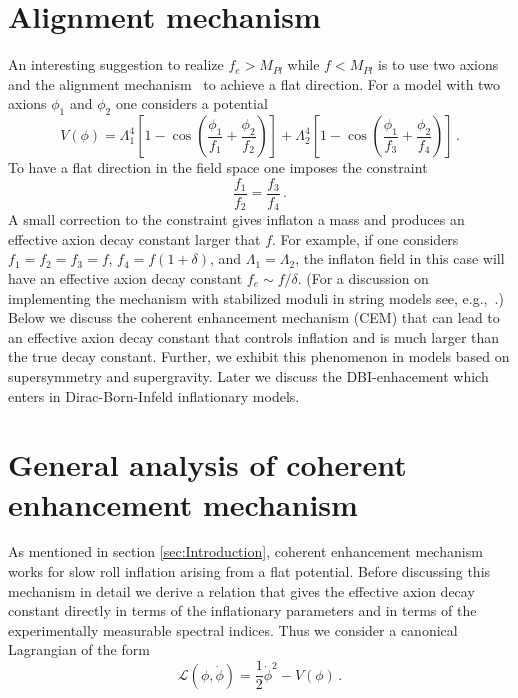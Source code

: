 \documentclass[12pt]{article}
\begin{document}
\section{Alignment mechanism \label{sec:Alignment}}
An interesting suggestion to realize $f_e > M_{Pl}$ while $f < M_{Pl}$ is to use two axions and the alignment mechanism~\cite{Kim:2004rp} to achieve a flat direction.
For a model with two axions $\phi_1$ and $\phi_2$ one considers a potential
\begin{equation} \label{eq:alignmentPotential}
  V(\phi)
    = \Lambda^4_1 \left[1 - \cos\left(\frac{\phi_1}{f_1} + \frac{\phi_2}{f_2}\right)\right]
    + \Lambda^4_2 \left[1 - \cos\left(\frac{\phi_1}{f_3} + \frac{\phi_2}{f_4}\right)\right]\,.
\end{equation}
To have a flat direction in the field space one imposes the constraint
\begin{equation} \label{eq:alignmentConstraint}
  \frac{f_1}{f_2} = \frac{f_3}{f_4}\,.
\end{equation}
A small correction to the constraint gives inflaton a mass and produces an effective axion decay constant larger that $f$.
For example, if one considers $f_1 = f_2 = f_3 = f$, $f_4 = f\left(1 + \delta\right)$, and $\Lambda_1 = \Lambda_2$, the inflaton field in this case will have an effective axion decay constant $f_e \sim f / \delta$.
(For a discussion on implementing the mechanism with stabilized moduli in string models see, e.g.,~\cite{Long:2014dta}.)
Below we discuss the coherent enhancement mechanism (CEM) that can lead to an effective axion decay constant that controls inflation and is much larger than the true decay constant.
Further, we exhibit this phenomenon in models based on supersymmetry and supergravity.
Later we discuss the DBI-enhacement which enters in Dirac-Born-Infeld inflationary models.

\section{General analysis of coherent enhancement mechanism \label{sec:CoherentEnhancement}}
As mentioned in section \ref{sec:Introduction}, coherent enhancement mechanism works for slow roll inflation arising from a flat potential.
Before discussing this mechanism in detail we derive a relation that gives the effective axion decay constant directly in terms of the inflationary parameters and in terms of the experimentally measurable spectral indices.
Thus we consider a canonical Lagrangian of the form
\begin{equation}
  \mathcal{L}\left(\phi, \dot{\phi}\right) = \frac{1}{2}{\dot{\phi}}^2 - V\left(\phi\right)\,.
\end{equation}
\end{document}
